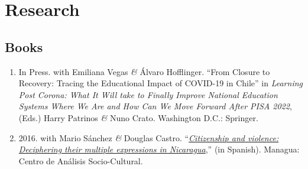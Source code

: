 \documentclass[a4paper, 10pt]{article}
\renewenvironment{itemize}{
  \begin{list}{}
    { \setlength{\itemsep}{5pt}
      \setlength{\parsep}{0pt}
      \setlength{\topsep}{0pt}
      \setlength{\leftmargin}{0em} } }{
  \end{list}}
\begin{document}





\section*{Research}

\subsection*{Books}

\begin{enumerate}[leftmargin=10pt, label={}, itemindent=-10pt, nosep]
\item In Press. with Emiliana Vegas \textit{\&} Álvaro Hofflinger. ``From
Closure to Recovery: Tracing the Educational Impact of COVID-19 in Chile'' in
\textit{Learning Post Corona: What It Will take to Finally Improve
National Education Systems Where We Are and How Can We Move Forward After PISA
2022}, (Eds.) Harry Patrinos \textit{\&} Nuno Crato. Washington D.C.: Springer.
\item 2016. with Mario Sánchez \textit{\&} Douglas Castro. ``\emph{\href{http://biblioteca.clacso.edu.ar/Nicaragua/casc-uca/20150313124733/Ciudadania-y-violencia.pdf}{Citizenship and violence: Deciphering their multiple expressions in Nicaragua}},'' (in Spanish). Managua: Centro de Análisis Socio-Cultural.
\end{enumerate}
\end{document}
